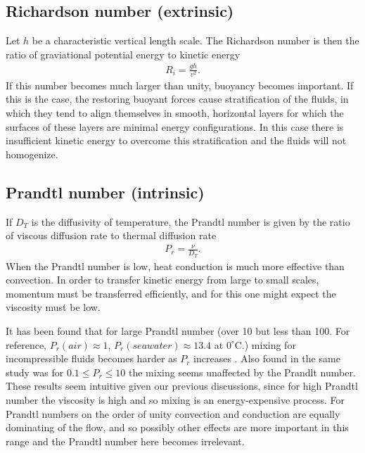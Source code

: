 \documentclass[a4paper,12pt]{article}
\begin{document}
\subsection{Richardson number (extrinsic)} 

Let $h$ be a characteristic vertical length scale. The Richardson number is then the ratio of graviational potential energy to kinetic energy
\begin{align*}
R_i = \frac{gh}{v^2}.
\end{align*} If this number becomes much larger than unity, buoyancy becomes important. If this is the case, the restoring buoyant forces cause stratification of the fluids, in which they tend to align themselves in smooth, horizontal layers for which the surfaces of these layers are minimal energy configurations. In this case there is insufficient kinetic energy to overcome this stratification and the fluids will not homogenize. 
\subsection{Prandtl number (intrinsic)} 

If $D_T$ is the diffusivity of temperature, the Prandtl number is given by the ratio of viscous diffusion rate to thermal diffusion rate
\begin{align*}
P_r=\frac{\nu}{D_T}.
\end{align*} When the Prandtl number is low, heat conduction is much more effective than convection. In order to transfer kinetic energy from large to small scales, momentum must be transferred efficiently, and for this one might expect the viscosity must be low.

It has been found that for large Prandtl number (over 10 but less than 100. For reference, $P_r(air) \approx 1$, $P_r(seawater) \approx 13.4$ at $0^\circ$C.) mixing for incompressible fluids becomes harder as $P_r$ increases \citep{lg013}. Also found in the same study was for $0.1 \le P_r \le 10$ the mixing seems unaffected by the Prandlt number. These results seem intuitive given our previous discussions, since for high Prandtl number the viscosity is high and so mixing is an energy-expensive process. For Prandtl numbers on the order of unity convection and conduction are equally dominating of the flow, and so possibly other effects are more important in this range and the Prandtl number here becomes irrelevant.
\end{document}
